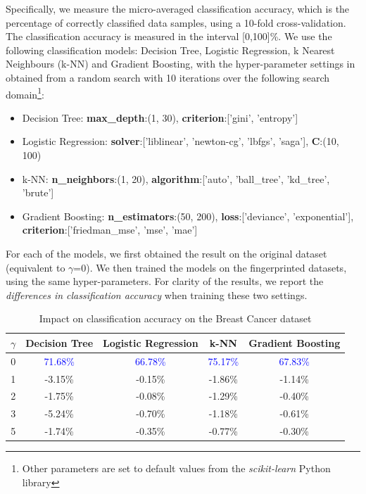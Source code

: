 \documentclass[runningheads]{llncs}
\begin{document}
Specifically, we measure the micro-averaged classification accuracy, which is the percentage of correctly classified data samples, using a 10-fold cross-validation. 
The classification accuracy is measured in the interval [0,100]\%.
We use the following classification models:
Decision Tree, Logistic Regression, k Nearest Neighbours (k-NN) and Gradient Boosting, with the hyper-parameter settings in  obtained from a random search with 10 iterations over the following search domain\footnote{Other parameters are set to default values from the \textit{scikit-learn} Python library}:
\begin{itemize}
    \item Decision Tree: \textbf{max\_depth}:(1, 30), \textbf{criterion}:['gini', 'entropy']
    \item Logistic Regression: \textbf{solver}:['liblinear', 'newton-cg', 'lbfgs', 'saga'], \textbf{C}:(10, 100)
    \item k-NN: \textbf{n\_neighbors}:(1, 20), \textbf{algorithm}:['auto', 'ball\_tree', 'kd\_tree', 'brute']
    \item Gradient Boosting: \textbf{n\_estimators}:(50, 200), \textbf{loss}:['deviance', 'exponential'], \textbf{criterion}:['friedman\_mse', 'mse', 'mae']
\end{itemize}

For each of the models, we first obtained the result on the original dataset (equivalent to $\gamma$=0).
We then trained the models on the fingerprinted datasets, using the same hyper-parameters.
For clarity of the results, we report the \textit{differences in classification accuracy} when training these two settings.


\begin{table}[ht]
\centering
\caption{Impact on classification accuracy on the Breast Cancer dataset}
\label{tab:ml-breast-cancer}
\begin{tabular}{@{}c|cccc@{}}
\toprule
$\gamma$ & \multicolumn{1}{c}{Decision Tree} & \multicolumn{1}{c}{Logistic Regression} & \multicolumn{1}{c}{k-NN} & \multicolumn{1}{c}{Gradient Boosting} \\ \midrule
0 & \textcolor{blue}{71.68\%} & \textcolor{blue}{66.78\%} & \textcolor{blue}{75.17\%} & \textcolor{blue}{67.83\%} \\
\hline
1     & -3.15\%                           & -0.15\%                                 & -1.86\%                 & -1.14\%                              \\
2     & -1.75\%                           & -0.08\%                                 & -1.29\%                  &    -0.40\%                                   \\
3     & -5.24\%                           & -0.70\%                                 & -1.18\%                  &  -0.61\%
\\
5     & -1.74\%                           & -0.35\%                                 & -0.77\%                  & -0.30\%                               \\ \bottomrule
\end{tabular}
\end{table}
\end{document}

